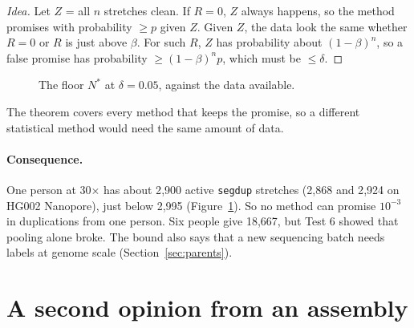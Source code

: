 \documentclass[11pt]{article}
\newcommand{\grp}[1]{\texttt{#1}}
\begin{document}
\begin{proof}[Idea]
Let $Z$ = all $n$ stretches clean. If $R=0$, $Z$ always happens, so the method
promises with probability $\ge p$ given $Z$. Given $Z$, the data look the same
whether $R=0$ or $R$ is just above $\beta$. For such $R$, $Z$ has probability
about $(1-\beta)^n$, so a false promise has probability $\ge(1-\beta)^n p$,
which must be $\le\delta$.
\end{proof}

\begin{figure}[h]
\centering
{}
\caption{The floor $N^*$ at $\delta=0.05$, against the data available.}
\label{fig:floor}
\end{figure}

The theorem covers every method that keeps the promise, so a different
statistical method would need the same amount of data.

\paragraph{Consequence.} One person at 30$\times$ has about 2{,}900 active
\grp{segdup} stretches (2{,}868 and 2{,}924 on HG002 Nanopore), just below
2{,}995 (Figure~\ref{fig:floor}). So no method can promise $10^{-3}$ in
duplications from one person. Six people give 18{,}667, but Test 6 showed
that pooling alone broke. The bound also says that a new
sequencing batch needs labels at genome scale (Section~\ref{sec:parents}).

\section{A second opinion from an assembly}\label{sec:assembly}
\end{document}

